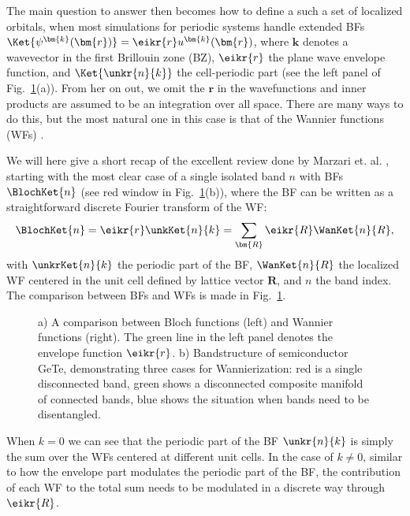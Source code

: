 The main question to answer then becomes how to define a such a set of localized orbitals, when most simulations for periodic systems handle extended BFs $\Ket{\psi^{\bm{k}}(\bm{r})} = \eikr{r} u^{\bm{k}}(\bm{r})$, where $\bm{k}$ denotes a wavevector in the first Brillouin zone (BZ), $\eikr{r}$ the plane wave envelope function, and $\Ket{\unkr{n}{k}}$ the cell-periodic part (see the left panel of Fig.~\ref{fig:Theory_blochvswan}(a)).
From her on out, we omit the $\bm{r}$ in the wavefunctions and inner products are assumed to be an integration over all space.
There are many ways to do this, but the most natural one in this case is that of the Wannier functions (WFs) \cite{Wannier1937}.

We will here give a short recap of the excellent review done by Marzari et. al. \cite{Marzari2012}, starting with the most clear case of a single isolated band $n$ with BFs $\BlochKet{n}$ (see red window in Fig.~\ref{fig:Theory_blochvswan}(b)), where the BF can be written as a straightforward discrete Fourier transform of the WF: 
\begin{equation}
	\label{eq:Theory_1bandwan}
	\BlochKet{n} = \eikr{r} \unkKet{n}{k} = \sum_{\bm{R}} \eikr{R} \WanKet{n}{R},
\end{equation}
with $\unkrKet{n}{k}$ the periodic part of the BF, $\WanKet{n}{R}$ the localized WF centered in the unit cell defined by lattice vector $\bm{R}$, and $n$ the band index.
The comparison between BFs and WFs is made in Fig.~\ref{fig:Theory_blochvswan}.
\begin{figure}
	\begin{subfigure}{0.49\textwidth}
		\caption{}
	\end{subfigure}
	\begin{subfigure}{0.49\textwidth}
		\caption{}
	\end{subfigure}
	\caption{\label{fig:Theory_blochvswan} a) A comparison between Bloch functions (left) and Wannier functions (right). The green line in the left panel denotes the envelope function $\eikr{r}$. b) Bandstructure of semiconductor GeTe, demonstrating three cases for Wannierization: red is a single disconnected band, green shows a disconnected composite manifold of connected bands, blue shows the situation when bands need to be disentangled.}
\end{figure}
When $k=0$ we can see that the periodic part of the BF $\unkr{n}{k}$ is simply the sum over the WFs centered at different unit cells.
In the case of $k \neq 0$, similar to how the envelope part modulates the periodic part of the BF, the contribution of each WF to the total sum needs to be modulated in a discrete way through $\eikr{R}$.

